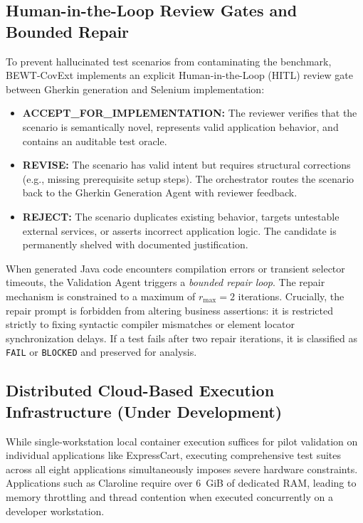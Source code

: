 \documentclass[pdflatex,sn-mathphys-num]{sn-jnl}
\begin{document}
\subsection{Human-in-the-Loop Review Gates and Bounded Repair}

To prevent hallucinated test scenarios from contaminating the benchmark, BEWT-CovExt implements an explicit Human-in-the-Loop (HITL) review gate between Gherkin generation and Selenium implementation:
\begin{itemize}
    \item \textbf{ACCEPT\_FOR\_IMPLEMENTATION:} The reviewer verifies that the scenario is semantically novel, represents valid application behavior, and contains an auditable test oracle.
    \item \textbf{REVISE:} The scenario has valid intent but requires structural corrections (e.g., missing prerequisite setup steps). The orchestrator routes the scenario back to the Gherkin Generation Agent with reviewer feedback.
    \item \textbf{REJECT:} The scenario duplicates existing behavior, targets untestable external services, or asserts incorrect application logic. The candidate is permanently shelved with documented justification.
\end{itemize}

When generated Java code encounters compilation errors or transient selector timeouts, the Validation Agent triggers a \textit{bounded repair loop}. The repair mechanism is constrained to a maximum of $r_{\max} = 2$ iterations. Crucially, the repair prompt is forbidden from altering business assertions: it is restricted strictly to fixing syntactic compiler mismatches or element locator synchronization delays. If a test fails after two repair iterations, it is classified as \texttt{FAIL} or \texttt{BLOCKED} and preserved for analysis.

\subsection{Distributed Cloud-Based Execution Infrastructure (Under Development)}\label{subsec:cloud-infra-dev}

While single-workstation local container execution suffices for pilot validation on individual applications like ExpressCart, executing comprehensive test suites across all eight applications simultaneously imposes severe hardware constraints. Applications such as Claroline require over 6~GiB of dedicated RAM, leading to memory throttling and thread contention when executed concurrently on a developer workstation.
\end{document}
